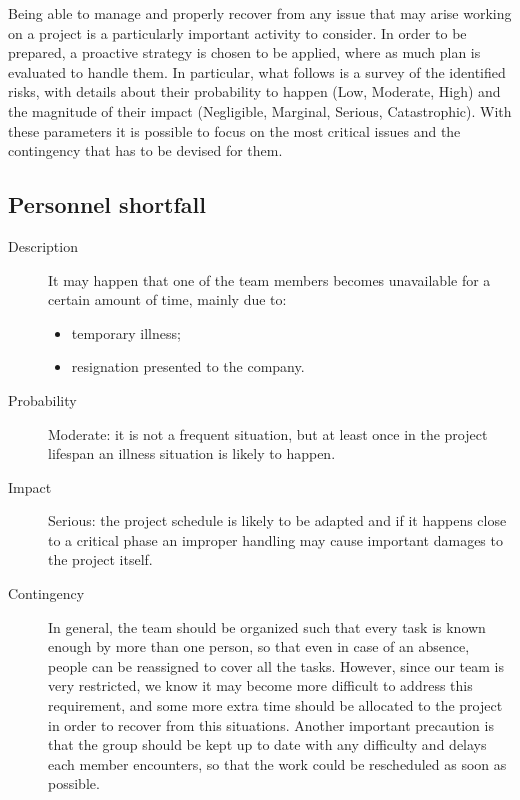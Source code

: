 Being able to manage and properly recover from any issue that may arise working on a project is a particularly important activity to consider. In order to be prepared, a proactive strategy is chosen to be applied, where as much plan is evaluated to handle them. In particular, what follows is a survey of the identified risks, with details about their probability to happen (Low, Moderate, High) and the magnitude of their impact (Negligible, Marginal, Serious, Catastrophic). With these parameters it is possible to focus on the most critical issues and the contingency that has to be devised for them.

\subsection*{Personnel shortfall}
	\begin{description}
		\item[Description] It may happen that one of the team members becomes unavailable for a certain amount of time, mainly due to:
			\begin{itemize}
				\item temporary illness;
				\item resignation presented to the company.
			\end{itemize}
		\item[Probability] Moderate: it is not a frequent situation, but at least once in the project lifespan an illness situation is likely to happen.
		\item[Impact] Serious: the project schedule is likely to be adapted and if it happens close to a critical phase an improper handling may cause important damages to the project itself.
		\item[Contingency] In general, the team should be organized such that every task is known enough by more than one person, so that even in case of an absence, people can be reassigned to cover all the tasks. However, since our team is very restricted, we know it may become more difficult to address this requirement, and some more extra time should be allocated to the project in order to recover from this situations. Another important precaution is that the group should be kept up to date with any difficulty and delays each member encounters, so that the work could be rescheduled as soon as possible.
	\end{description}

